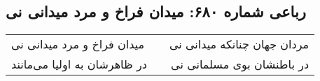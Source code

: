 \begin{center}
\section*{رباعی شماره ۶۸۰: میدان فراخ و مرد میدانی نی}
\label{sec:sh680}
\begin{longtable}{l p{0.5cm} r}
میدان فراخ و مرد میدانی نی
&&
مردان جهان چنانکه میدانی نی
\\
در ظاهرشان به اولیا می‌مانند
&&
در باطنشان بوی مسلمانی نی
\\
\end{longtable}
\end{center}
